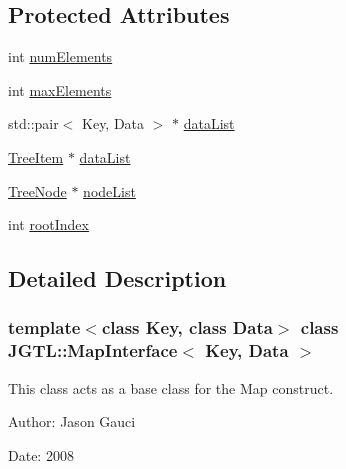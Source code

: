 \subsection*{Protected Attributes}
\begin{CompactItemize}
\item 
int \hyperlink{class_j_g_t_l_1_1_map_interface_02b41b644ec9f7fc80888f2a621262e3}{num\-Elements}
\item 
int \hyperlink{class_j_g_t_l_1_1_map_interface_fd420367e3791206e3f22e9610e21afc}{max\-Elements}
\item 
std::pair$<$ Key, Data $>$ $\ast$ \hyperlink{class_j_g_t_l_1_1_map_interface_b2f183b5fa7244a2b85571c2a62235c1}{data\-List}
\item 
\hyperlink{class_j_g_t_l_1_1_map_interface_b7e9654bf9b2a906465e362475466ca5}{Tree\-Item} $\ast$ \hyperlink{class_j_g_t_l_1_1_map_interface_86fa704452e650dac12e3d01804739c2}{data\-List}
\item 
\hyperlink{class_j_g_t_l_1_1_binary_tree_node}{Tree\-Node} $\ast$ \hyperlink{class_j_g_t_l_1_1_map_interface_7b271ddce20b3fc8386360ca277da4fa}{node\-List}
\item 
int \hyperlink{class_j_g_t_l_1_1_map_interface_9407ca6114c7972d533f22ad1061e23b}{root\-Index}
\end{CompactItemize}


\subsection{Detailed Description}
\subsubsection*{template$<$class Key, class Data$>$ class JGTL::Map\-Interface$<$ Key, Data $>$}

This class acts as a base class for the Map construct. 

\begin{Desc}
\item[Author:]Jason Gauci \end{Desc}
\begin{Desc}
\item[Date:]2008 \end{Desc}




